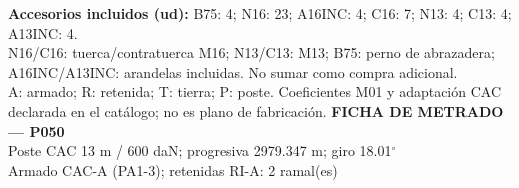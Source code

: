 \begingroup\scriptsize
\textbf{Accesorios incluidos (ud):} B75: 4; N16: 23; A16INC: 4; C16: 7; N13: 4; C13: 4; A13INC: 4.\\
N16/C16: tuerca/contratuerca M16; N13/C13: M13; B75: perno de abrazadera; A16INC/A13INC: arandelas incluidas. No sumar como compra adicional.\\
A: armado; R: retenida; T: tierra; P: poste. Coeficientes M01 y adaptación CAC declarada en el catálogo; no es plano de fabricación.
\endgroup\endgroup
\clearpage{}
\begingroup\small\setlength{\parskip}{3pt}\renewcommand{\arraystretch}{1.05}
\textbf{\large FICHA DE METRADO — P050}\\[4pt]
Poste CAC 13 m / 600 daN; progresiva 2979.347 m; giro 18.01\ensuremath{^\circ}\\
Armado CAC-A (PA1-3); retenidas RI-A: 2 ramal(es)\\
\begingroup\scriptsize
